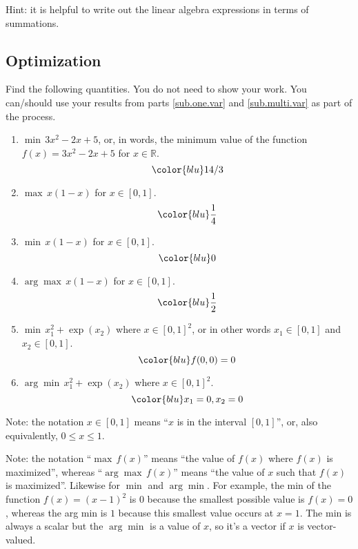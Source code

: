 \documentclass{article}
\def\blu#1{{\color{blu}#1}}
\def\R{\mathbb{R}}
\begin{document}
Hint: it is helpful to write out the linear algebra expressions in terms of summations.


\subsection{Optimization}
\blu{Find the following quantities.} You do not need to show your work. 
You can/should use your results from parts \ref{sub.one.var} and \ref{sub.multi.var} as part of the process.

\begin{enumerate}
\item $\min \, 3x^2-2x+5$, or, in words, the minimum value of the function $f(x) = 3x^2 -2x + 5$ for $x \in \R$.
\begin{equation}\color{blu} 14/3 \end{equation}
\item $\max \, x(1-x)$ for $x\in [0,1]$.
\begin{equation}\color{blu} \frac{1}{4} \end{equation}
\item $\min \, x(1-x)$ for $x\in [0,1]$.
\begin{equation}\color{blu} 0 \end{equation}
\item $\arg \max \, x(1-x)$ for $x\in[0,1]$. 
\begin{equation}\color{blu} \frac{1}{2} \end{equation}
\item $\min \, x_1^2 + \exp(x_2)$ where $x \in [0,1]^2$, or in other words $x_1\in [0,1]$ and $x_2\in [0,1]$.
\begin{equation}\color{blu} f(0,0)=0 \end{equation}
\item $\arg \min \, x_1^2 + \exp(x_2)$ where $x \in [0,1]^2$. 
\begin{equation}\color{blu} x_{1}=0, x_{2}=0 \end{equation}
\end{enumerate}

Note: the notation $x\in [0,1]$ means ``$x$ is in the interval $[0,1]$'', or, also equivalently, $0 \leq x \leq 1$.

Note: the notation ``$\max \, f(x)$'' means ``the value of $f(x)$ where $f(x)$ is maximized'', whereas ``$\arg \max \, f(x)$'' means ``the value of $x$ such that $f(x)$ is maximized''.
Likewise for $\min$ and $\arg \min$. For example, the min of the function $f(x)=(x-1)^2$ is $0$ because the smallest possible value is $f(x)=0$, 
whereas the arg min is $1$ because this smallest value occurs at $x=1$. The min is always a scalar but the $\arg \min$ is a value of $x$, so it's a vector 
if $x$ is vector-valued.
\end{document}
